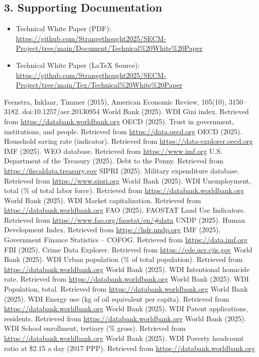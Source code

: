 \documentclass[12pt,a4paper]{article}
\begin{document}
\subsection*{3. Supporting Documentation}
\begin{itemize}
    \item Technical White Paper (PDF): \url{https://github.com/Strangethought2025/SECM-Project/tree/main/Document/Technical\%20White\%20Paper}
    \item Technical White Paper (LaTeX Source): \url{https://github.com/Strangethought2025/SECM-Project/tree/main/Tex/Technical\%20White\%20Paper}
\end{itemize}
\begin{thebibliography}{99}
 Feenstra, Inklaar, Timmer (2015), American Economic Review, 105(10), 3150–3182. doi:10.1257/aer.20130954
 World Bank (2025). WDI Gini index. Retrieved from \url{https://databank.worldbank.org}
 OECD (2025). Trust in government, institutions, and people. Retrieved from \url{https://data.oecd.org}
 OECD (2025). Household saving rate (indicator). Retrieved from \url{https://data-explorer.oecd.org}
 IMF (2025). WEO database. Retrieved from \url{https://www.imf.org}
 U.S. Department of the Treasury (2025). Debt to the Penny. Retrieved from \url{https://fiscaldata.treasury.gov}
 SIPRI (2025). Military expenditure database. Retrieved from \url{https://www.sipri.org}
 World Bank (2025). WDI Unemployment, total (\% of total labor force). Retrieved from \url{https://databank.worldbank.org}
 World Bank (2025). WDI Market capitalization. Retrieved from \url{https://databank.worldbank.org}
 FAO (2025). FAOSTAT Land Use Indicators. Retrieved from \url{https://www.fao.org/faostat/en/#data}
 UNDP (2025). Human Development Index. Retrieved from \url{https://hdr.undp.org}
 IMF (2025). Government Finance Statistics – COFOG. Retrieved from \url{https://data.imf.org}
 FBI (2025). Crime Data Explorer. Retrieved from \url{https://cde.ucr.cjis.gov}
 World Bank (2025). WDI Urban population (\% of total population). Retrieved from \url{https://databank.worldbank.org}
 World Bank (2025). WDI Intentional homicide rate. Retrieved from \url{https://databank.worldbank.org}
 World Bank (2025). WDI Population, total. Retrieved from \url{https://databank.worldbank.org}
 World Bank (2025). WDI Energy use (kg of oil equivalent per capita). Retrieved from \url{https://databank.worldbank.org}
 World Bank (2025). WDI Patent applications, residents. Retrieved from \url{https://databank.worldbank.org}
 World Bank (2025). WDI School enrollment, tertiary (\% gross). Retrieved from \url{https://databank.worldbank.org}
 World Bank (2025). WDI Poverty headcount ratio at \$2.15 a day (2017 PPP). Retrieved from \url{https://databank.worldbank.org}
\end{thebibliography}
\end{document}
